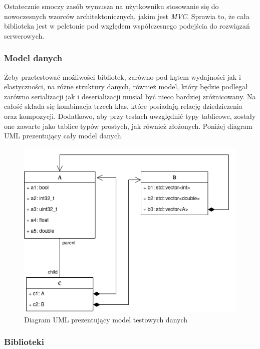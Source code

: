 \documentclass[12pt]{article}
\begin{document}
{{{				Ostatecznie smoczy zasób wymusza na użytkowniku stosowanie się do nowoczesnych wzorców architektonicznych, jakim jest {\it MVC}\cite{mvc}.
				Sprawia to, że cała biblioteka jest w peletonie pod względem współczesnego podejścia do rozwiązań serwerowych.
			}

			{
				\subsubsection{Model danych}

				Żeby przetestować możliwości bibliotek, zarówno pod kątem wydajności jak i elastyczności, na różne struktury danych,
				również model, który będzie podlegał zarówno serializacji jak i deserializacji musiał być nieco bardziej zróżnicowany.
				Na całość składa się kombinacja trzech klas, które posiadają relację dziedziczenia oraz kompozycji. Dodatkowo, aby przy
				testach uwzględnić typy tablicowe, zostały one zawarte jako tablice typów prostych, jak również złożonych. Poniżej
				diagram UML prezentujący cały model danych.

				\begin{figure}[H]
					\centering
					\includegraphics[width=15cm,keepaspectratio=true]{./img/benchmark_model_uml_diagram.png}
					\caption*{Diagram UML prezentujący model testowych danych}
					\medskip
				\end{figure}
			}

			{
				\subsubsection{Biblioteki}

}}}
\end{document}
